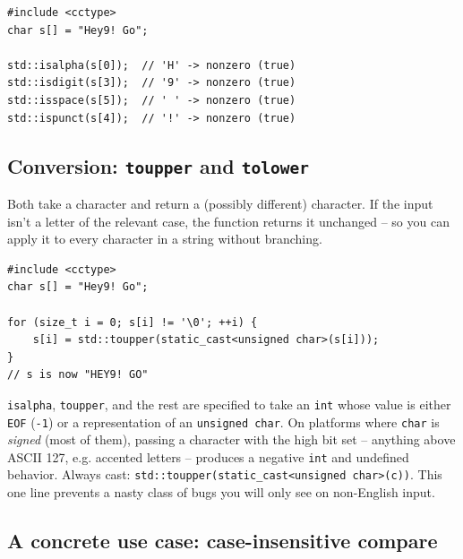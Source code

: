 \documentclass[11pt]{article}
\begin{document}
\begin{examplebox}
\begin{verbatim}
#include <cctype>
char s[] = "Hey9! Go";

std::isalpha(s[0]);  // 'H' -> nonzero (true)
std::isdigit(s[3]);  // '9' -> nonzero (true)
std::isspace(s[5]);  // ' ' -> nonzero (true)
std::ispunct(s[4]);  // '!' -> nonzero (true)
\end{verbatim}
\end{examplebox}

\subsection{Conversion: \texttt{toupper} and \texttt{tolower}}

Both take a character and return a (possibly different) character. If
the input isn't a letter of the relevant case, the function returns it
unchanged -- so you can apply it to every character in a string
without branching.

\begin{examplebox}
\begin{verbatim}
#include <cctype>
char s[] = "Hey9! Go";

for (size_t i = 0; s[i] != '\0'; ++i) {
    s[i] = std::toupper(static_cast<unsigned char>(s[i]));
}
// s is now "HEY9! GO"
\end{verbatim}
\end{examplebox}

\begin{warnbox}
\texttt{isalpha}, \texttt{toupper}, and the rest are specified to take
an \texttt{int} whose value is either \texttt{EOF} (\texttt{-1}) or a
representation of an \texttt{unsigned char}. On platforms where
\texttt{char} is \emph{signed} (most of them), passing a character
with the high bit set -- anything above ASCII 127, e.g. accented
letters -- produces a negative \texttt{int} and undefined behavior.
Always cast: \texttt{std::toupper(static\_cast<unsigned char>(c))}.
This one line prevents a nasty class of bugs you will only see on
non-English input.
\end{warnbox}

\subsection{A concrete use case: case-insensitive compare}
\end{document}
